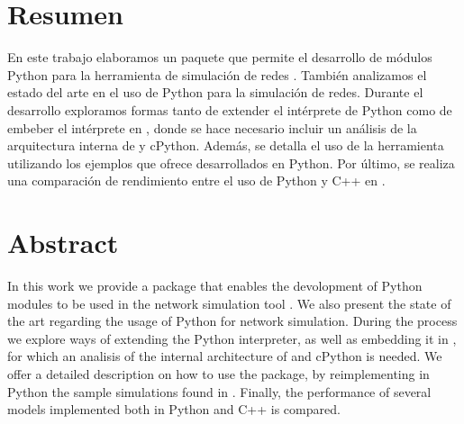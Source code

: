 \chapter*{Resumen}
En este trabajo elaboramos un paquete que permite el desarrollo de módulos
Python para la herramienta de simulación de redes \omnetpp{}. También
analizamos el estado del arte en el uso de Python para la simulación de redes.
Durante el desarrollo exploramos formas tanto de extender el intérprete de
Python como de embeber el intérprete en \omnetpp{}, donde se hace necesario
incluir un análisis de la arquitectura interna de \omnetpp{} y cPython. Además,
se detalla el uso de la herramienta utilizando los ejemplos que ofrece
\omnetpp{} desarrollados en Python. Por último, se realiza una comparación de
rendimiento entre el uso de Python y C++ en \omnetpp{}.

\chapter*{Abstract}
In this work we provide a package that enables the devolopment of Python
modules to be used in the network simulation tool \omnetpp{}. We also present
the state of the art regarding the usage of Python for network simulation.
During the process we explore ways of extending the Python interpreter, as well
as embedding it in \omnetpp{}, for which an analisis of the internal
architecture of \omnetpp{} and cPython is needed. We offer a detailed
description on how to use the package, by reimplementing in Python the sample
simulations found in \omnetpp{}. Finally, the performance of several \omnetpp{}
models implemented both in Python and C++ is compared.
